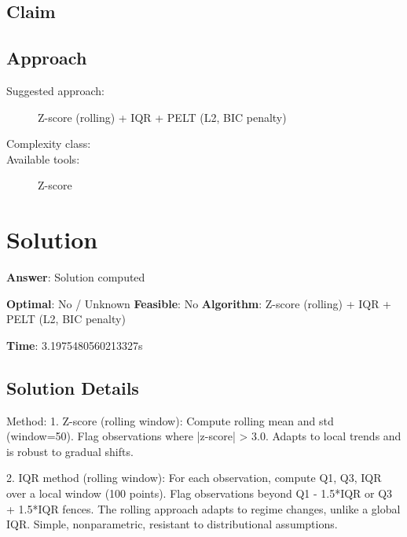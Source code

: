 \documentclass[11pt, a4paper]{article}
\begin{document}
\subsection{Claim}


\subsection{Approach}

\begin{description}
  \item[Suggested approach:] Z-score (rolling) + IQR + PELT (L2, BIC penalty)
  \item[Complexity class:] 
  \item[Available tools:] Z-score
\end{description}
\section{Solution}

\begin{polyaresult}

\textbf{Answer}: Solution computed


\textbf{Optimal}: No / Unknown \hfill
\textbf{Feasible}: No
\textbf{Algorithm}: Z-score (rolling) + IQR + PELT (L2, BIC penalty) \quad $$

\textbf{Time}: 3.1975480560213327s


\end{polyaresult}

\subsection{Solution Details}


Method: 1. Z-score (rolling window): Compute rolling mean and std (window=50). Flag observations where |z-score| > 3.0. Adapts to local trends and is robust to gradual shifts.

2. IQR method (rolling window): For each observation, compute Q1, Q3, IQR over a local window (100 points). Flag observations beyond Q1 - 1.5*IQR or Q3 + 1.5*IQR fences. The rolling approach adapts to regime changes, unlike a global IQR. Simple, nonparametric, resistant to distributional assumptions.
\end{document}
